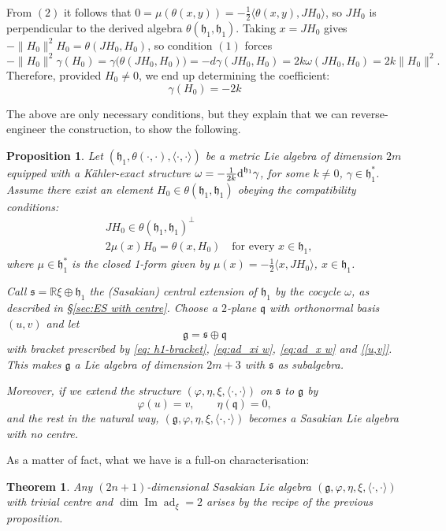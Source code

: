 \documentclass[12pt, twoside]{amsart}
\def\D{\textup{d}}
\def\g{\mathfrak{g}}
\def\h{\mathfrak{h}}
\def\q{\mathfrak{q}}
\def\s{\mathfrak s}
\def\R{\mathbb{R}}
\def\ad{\operatorname{ad}}
\renewcommand{\Im}{\operatorname{Im}}
\def\pint{\langle \cdotp,\cdotp \rangle }
\newtheorem{prop}[definition]{Proposition}
\newtheorem{thm}[definition]{Theorem}
\theoremstyle{definition}
\begin{document}
From $(2)$ it follows that  $0=\mu(\theta(x,y))=-\frac{1}{2}\langle \theta(x,y), JH_0\rangle$, so $JH_0$ is perpendicular to the derived algebra $\theta(\h_1,\h_1)$.
Taking $x=J H_0$ 
gives $-\| H_0 \| ^{2}H_{0}=\theta(JH_{0},H_{0})$, so condition $(1)$ forces
$$    -\| H_{0} \| ^{2}\gamma (H_0)=\gamma\big(\theta(JH_{0},H_{0})\big)
    =-d\gamma(JH_0,H_0)     =2k\omega(JH_0,H_0)     =2k\| H_{0}\| ^{2}.
$$
Therefore, provided $H_0\neq 0$, we end up determining the 
coefficient:
\begin{equation}\label{gamma en H0}
    \gamma(H_0)=-2k
\end{equation}

The above are only necessary conditions, but they explain that we can reverse-engineer the construction, to show the following.

\begin{prop}\label{h1 crea sasaki sin centro}
    Let  $(\h_1, \theta(\cdot,\cdot), \pint)$ be a metric Lie algebra of dimension $2m$  equipped with a K{\"a}hler-exact structure $\omega=-\frac{1}{2k}\D^{\h_1}\gamma$, for some $k\neq 0$, $\gamma \in \h_{1}^*$.
 Assume there exist an element $H_0 \in \theta(\h_1,\h_1)$ obeying the compatibility conditions:
\begin{align}
    & JH_0 \in \theta(\h_1,\h_1)^{\perp}  \label{eq: JH0}\\ 
    & 2\mu(x)H_0=\theta(x,H_0) \quad \text{for every } x \in \h_1, \label{eq: importante}
\end{align}
where $\mu\in\h_1^*$ is the closed 1-form given by $\mu(x)=-\frac12\langle x,JH_0\rangle$, $x\in \h_1$. \par 
Call $\s= \R\xi \oplus \h_1$ the (Sasakian) central extension of $\h_1$ by the cocycle $\omega$, as described in \S \ref{sec:ES with centre}.  
Choose a $2$-plane ${\q}$ with orthonormal basis $(u,v)$ and let 
\[ \g=\s \oplus {\q}\]
with bracket prescribed by \eqref{eq: h1-bracket}, \eqref{eq:ad_xi w}, \eqref{eq:ad_x w} and \eqref{[u,v]}. This makes  $\g$ a Lie algebra of dimension $2m+3$ with $\s$ as subalgebra. \par
Moreover, if we extend the structure $(\varphi, \eta, \xi, \pint)$ on $\s$ to $\g$ by 
$$\varphi (u)=v,\qquad \eta({\q})=0,$$  
and the rest in the natural way, $(\g, \varphi, \eta, \xi , \pint)$ becomes a Sasakian Lie algebra with no centre.
\end{prop}

As a matter of fact, what we have is a full-on characterisation:
\begin{thm}\label{carac sasaki}
Any $(2n+1)$-dimensional Sasakian Lie algebra  $(\g, \varphi, \eta, \xi , \pint)$ with trivial centre and $\dim \Im  \ad_{\xi}=2$ arises by the recipe of the previous proposition.
\end{thm}
\end{document}
